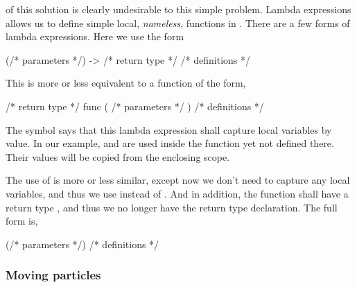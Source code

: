 of this solution is clearly undesirable to this simple problem. Lambda
expressions allows us to define simple local, \emph{nameless}, functions in
\cpp. There are a few forms of lambda expressions. Here we use the form
\begin{cppcode}
[=] (/* parameters */) -> /* return type */ { /* definitions */ }
\end{cppcode}
This is more or less equivalent to a function of the form,
\begin{cppcode}
/* return type */ func ( /* parameters */ ) { /* definitions */ }
\end{cppcode}
The symbol \code{[=]} says that this lambda expression shall capture local
variables by value. In our example,  and  are used inside
the function yet not defined there. Their values will be copied from the
enclosing scope.

The use of  is more or less similar, except now we
don't need to capture any local variables, and thus we use \code{[]} instead
of \code{[=]}. And in addition, the function shall have a return type
, and thus we no longer have the return type declaration. The full
form is,
\begin{cppcode}
[] (/* parameters */) { /* definitions */ }
\end{cppcode}

\subsubsection{Moving particles}
\label{ssub:Moving particles}

